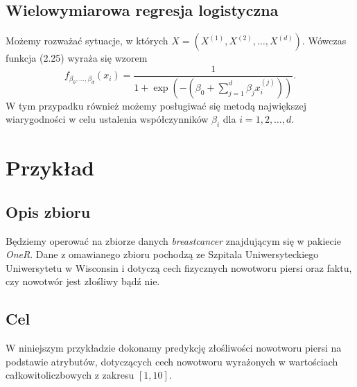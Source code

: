 \documentclass[a4paper]{article}
\begin{document}
\subsection{Wielowymiarowa regresja logistyczna}
Możemy rozważać sytuacje, w których $X = (X^{(1)}, X^{(2)}, \dots , X^{(d)})$. Wówczas funkcja {(2.25)} wyraża się wzorem
\begin{equation}
    f_{\beta_0,\dots,\beta_d}(x_i) = \frac{1}{1 + \exp{\left(-\left(\beta_0 + \sum\limits_{j=1}^d\beta_jx^{(j)}_i\right)\right)}}.
\end{equation}
W tym przypadku również możemy posługiwać się metodą największej wiarygodności w celu ustalenia współczynników $\beta_i$ dla $i = 1,2,\dots, d$.
\newpage


\section{Przykład}
\subsection{Opis zbioru}
Będziemy operować na zbiorze danych \textit{breastcancer} znajdującym się w pakiecie \textit{OneR}. Dane z omawianego zbioru pochodzą ze Szpitala Uniwersyteckiego Uniwersytetu w Wisconsin i dotyczą cech fizycznych nowotworu piersi oraz faktu, czy nowotwór jest złośliwy bądź nie.
\subsection{Cel}
 W niniejszym przykładzie dokonamy predykcję złośliwości nowotworu piersi na podstawie atrybutów, dotyczących cech nowotworu wyrażonych w wartościach całkowitoliczbowych z zakresu $[1,10]$.
\end{document}
